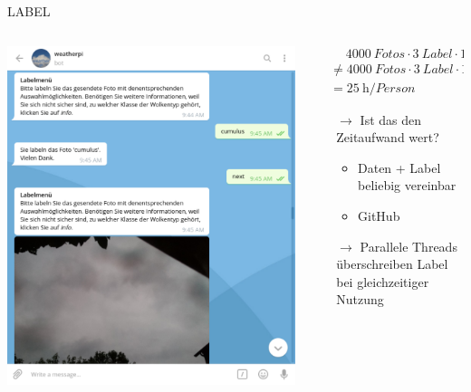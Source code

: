 \begin{frame}[t]{LABEL}
  \begin{columns}
    \begin{column}{0.4\textwidth}
      \centering
      \includegraphics[width=\textwidth]{content/telegram_bot.pdf}
    \end{column}
    \begin{column}{0.6\textwidth}
      \begin{align*}
        &\hspace{15pt} \SI{4000}{Fotos} \cdot \SI{3}{Label} \cdot \SI{1}{\second} \\
        &\neq \SI{4000}{Fotos}
        \cdot \SI{3}{Label} \cdot \SI{15}{\second} \\
        &= \SI{25}{\hour\per Person}
      \end{align*}
      \begin{itemize}
        \item[$\rightarrow$] Ist das den Zeitaufwand wert?
          \begin{itemize}
            \item Daten + Label beliebig vereinbar
            \item GitHub
          \end{itemize}
        \item[$\rightarrow$] Parallele Threads überschreiben Label bei gleichzeitiger
          Nutzung
      \end{itemize}
    \end{column}
  \end{columns}
\end{frame}

